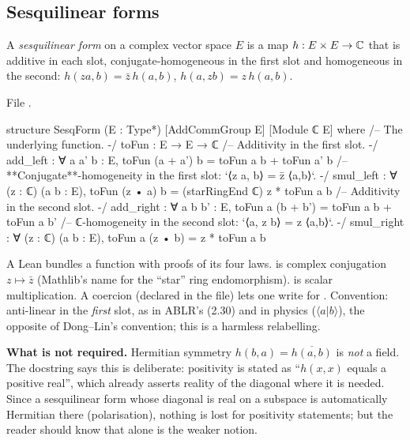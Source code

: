 \subsection{Sesquilinear forms}

\begin{definition}\label{l19:def:sesq}
A \emph{sesquilinear form} on a complex vector space $E$ is a map $h:E\times E\to{\mathbb{C}}$ that is
additive in each slot, conjugate-homogeneous in the first slot and homogeneous in the second:
$h(za,b) = \bar z\,h(a,b)$, $h(a,zb) = z\,h(a,b)$.
\end{definition}

\noindent File .
\begin{leancode}
structure SesqForm (E : Type*) [AddCommGroup E] [Module ℂ E] where
  /-- The underlying function. -/
  toFun : E → E → ℂ
  /-- Additivity in the first slot. -/
  add_left : ∀ a a' b : E, toFun (a + a') b = toFun a b + toFun a' b
  /-- **Conjugate**-homogeneity in the first slot: `⟨z a, b⟩ = z̄ ⟨a,b⟩`. -/
  smul_left : ∀ (z : ℂ) (a b : E), toFun (z • a) b = (starRingEnd ℂ) z * toFun a b
  /-- Additivity in the second slot. -/
  add_right : ∀ a b b' : E, toFun a (b + b') = toFun a b + toFun a b'
  /-- ℂ-homogeneity in the second slot: `⟨a, z b⟩ = z ⟨a,b⟩`. -/
  smul_right : ∀ (z : ℂ) (a b : E), toFun a (z • b) = z * toFun a b
\end{leancode}

\begin{dictionary}
A Lean  bundles a function  with proofs of its four laws.
 is complex conjugation $z\mapsto\bar z$ (Mathlib's name for the ``star''
ring endomorphism).  is scalar multiplication. A coercion (declared in the file) lets
one write  for . Convention: anti-linear in the \emph{first} slot,
as in ABLR's (2.30) and in physics ($\langle a|b\rangle$), the opposite of Dong--Lin's
convention; this is a harmless relabelling.

\textbf{What is not required.} Hermitian symmetry $h(b,a) = \overline{h(a,b)}$ is \emph{not} a field.
The docstring says this is deliberate: positivity is stated as ``$h(x,x)$ equals a positive
real'', which already asserts reality of the diagonal where it is needed. Since a sesquilinear form
whose diagonal is real on a subspace is automatically Hermitian there (polarisation), nothing is lost
for positivity statements; but the reader should know that  alone is the weaker
notion.
\end{dictionary}


